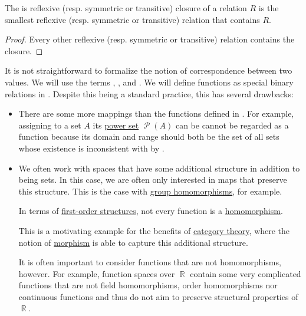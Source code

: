 \begin{proposition}\label{thm:derived_relations_characterization}
  The is reflexive (resp. symmetric or transitive) closure of a relation \( R \) is the smallest reflexive (resp. symmetric or transitive) relation that contains \( R \).
\end{proposition}
\begin{proof}
  Every other reflexive (resp. symmetric or transitive) relation contains the closure.
\end{proof}


\begin{remark}\label{rem:function_definition}
  It is not straightforward to formalize the notion of correspondence between two values. We will use the terms , ,  and . We will define functions as special binary relations in . Despite this being a standard practice, this has several drawbacks:

  \begin{itemize}
    \item There are some more mappings than the functions defined in . For example, assigning to a set \( A \) its \hyperref[def:basic_set_operations/power_set]{power set} \( \mscrP(A) \) can be cannot be regarded as a function because its domain and range should both be the set of all sets whose existence is inconsistent with \hyperref[def:zfc]{} by .

    \item We often work with spaces that have some additional structure in addition to being sets. In this case, we are often only interested in maps that preserve this structure. This is the case with \hyperref[def:group/homomorphism]{group homomorphisms}, for example.

    In terms of \hyperref[def:first_order_structure]{first-order structures}, not every function is a \hyperref[def:first_order_homomorphism]{homomorphism}.

    This is a motivating example for the benefits of \hyperref[sec:category_theory]{category theory}, where the notion of \hyperref[def:category/C2]{morphism} is able to capture this additional structure.

    It is often important to consider functions that are not homomorphisms, however. For example, function spaces over \( \BbbR \) contain some very complicated functions that are not field homomorphisms, order homomorphisms nor continuous functions and thus do not aim to preserve structural properties of \( \BbbR \).


\end{itemize}
\end{remark}
